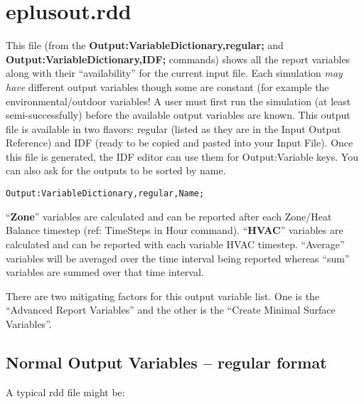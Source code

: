 \section{eplusout.rdd}

This file (from the \textbf{Output:VariableDictionary,regular;} and \textbf{Output:VariableDictionary,IDF;} commands) shows all the report variables along with their “availability” for the current input file. Each simulation \emph{may have} different output variables though some are constant (for example the environmental/outdoor variables! A user must first run the simulation (at least semi-successfully) before the available output variables are known. This output file is available in two flavors: regular (listed as they are in the Input Output Reference) and IDF (ready to be copied and pasted into your Input File). Once this file is generated, the IDF editor can use them for Output:Variable keys. You can also ask for the outputs to be sorted by name.

\begin{lstlisting}
Output:VariableDictionary,regular,Name;
\end{lstlisting}

``\textbf{Zone}'' variables are calculated and can be reported after each Zone/Heat Balance timestep (ref: TimeSteps in Hour command). ``\textbf{HVAC}'' variables are calculated and can be reported with each variable HVAC timestep. ``Average'' variables will be averaged over the time interval being reported whereas ``sum'' variables are summed over that time interval.

There are two mitigating factors for this output variable list. One is the “Advanced Report Variables” and the other is the “Create Minimal Surface Variables”.

\subsection{Normal Output Variables – regular format}

A typical rdd file might be:

